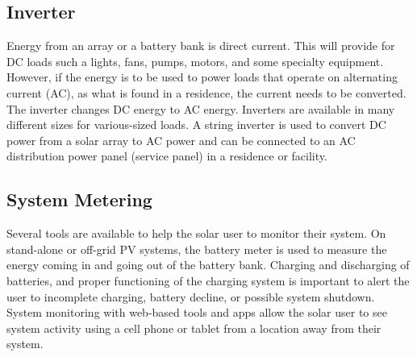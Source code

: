 
\subsection{Inverter}
Energy from an array or a battery bank is direct current. This will provide for DC loads such a lights, fans,
pumps, motors, and some specialty equipment. However,
if the energy is to be used to power loads that operate on
alternating current (AC), as what is found in a residence, the
current needs to be converted. The inverter changes DC energy
to AC energy. Inverters are available in many different sizes
for various-sized loads.
A string inverter is used to convert DC power from a solar
array to AC power and can be connected to an AC distribution
power panel (service panel) in a residence or facility\cite{pvarizona}.


\subsection{System Metering}
Several tools are available to help the solar user to monitor
their system. On stand-alone or off-grid PV systems, the
battery meter is used to measure the energy coming in and
going out of the battery bank. Charging and discharging of
batteries, and proper functioning of the charging system is
important to alert the user to incomplete charging, battery
decline, or possible system shutdown\cite{pvarizona}. System monitoring
with web-based tools and apps allow the solar user to see
system activity using a cell phone or tablet from a location
away from their system.